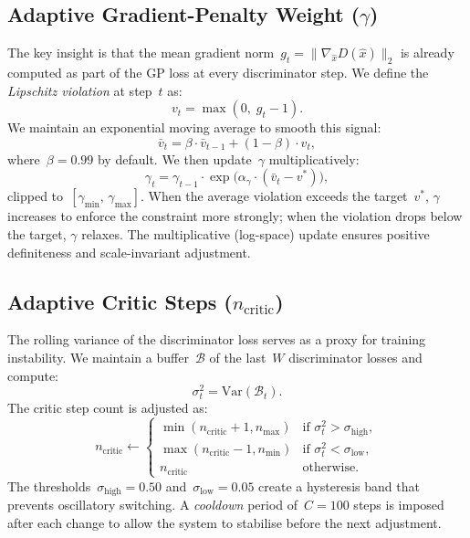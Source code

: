 \documentclass{article}
\newcommand{\vbar}{\bar{v}}
\newcommand{\vtarget}{v^{*}}
\newcommand{\ncritic}{n_{\mathrm{critic}}}
\newcommand{\ncmax}{n_{\mathrm{max}}}
\newcommand{\ncmin}{n_{\mathrm{min}}}
\begin{document}
\subsection{Adaptive Gradient-Penalty Weight ($\gamma$)}
\label{sec:gamma}

The key insight is that the mean gradient norm~$g_t = \|\nabla_{\hat{x}} D(\hat{x})\|_2$ is already computed as part of the GP loss at every discriminator step. We define the \emph{Lipschitz violation} at step~$t$ as:
\begin{equation}
    v_t = \max(0,\; g_t - 1).
\label{eq:violation}
\end{equation}
We maintain an exponential moving average to smooth this signal:
\begin{equation}
    \vbar_t = \beta \cdot \vbar_{t-1} + (1-\beta) \cdot v_t,
\label{eq:ema}
\end{equation}
where~$\beta=0.99$ by default. We then update~$\gamma$ multiplicatively:
\begin{equation}
    \gamma_t = \gamma_{t-1} \cdot \exp\!\bigl(\alpha_\gamma \cdot (\vbar_t - \vtarget)\bigr),
\label{eq:gamma_update}
\end{equation}
clipped to~$[\gamma_{\min},\, \gamma_{\max}]$. When the average violation exceeds the target~$\vtarget$, $\gamma$ increases to enforce the constraint more strongly; when the violation drops below the target, $\gamma$ relaxes. The multiplicative (log-space) update ensures positive definiteness and scale-invariant adjustment.

\subsection{Adaptive Critic Steps ($\ncritic$)}
\label{sec:ncritic}

The rolling variance of the discriminator loss serves as a proxy for training instability. We maintain a buffer~$\mathcal{B}$ of the last~$W$ discriminator losses and compute:
\begin{equation}
    \sigma^2_t = \mathrm{Var}(\mathcal{B}_t).
\label{eq:loss_var}
\end{equation}
The critic step count is adjusted as:
\begin{equation}
    \ncritic \leftarrow
    \begin{cases}
        \min(\ncritic + 1, \ncmax) & \text{if } \sigma^2_t > \sigma_{\mathrm{high}}, \\[3pt]
        \max(\ncritic - 1, \ncmin) & \text{if } \sigma^2_t < \sigma_{\mathrm{low}}, \\[3pt]
        \ncritic                    & \text{otherwise}.
    \end{cases}
\label{eq:ncritic_update}
\end{equation}
The thresholds~$\sigma_{\mathrm{high}} = 0.50$ and~$\sigma_{\mathrm{low}} = 0.05$ create a hysteresis band that prevents oscillatory switching. A \emph{cooldown} period of~$C=100$ steps is imposed after each change to allow the system to stabilise before the next adjustment.
\end{document}
